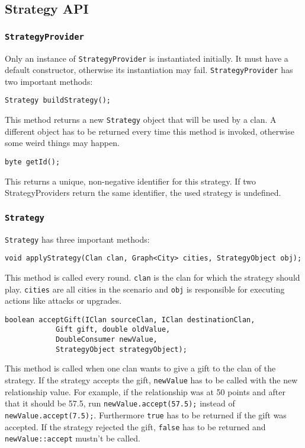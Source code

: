 \documentclass{article}
\begin{document}
    \subsection{Strategy API}

    \subsubsection{\texttt{StrategyProvider}}
    Only an instance of \texttt{StrategyProvider} is instantiated initially.
    It must have a default constructor, otherwise its instantiation may fail. \texttt{StrategyProvider} has two important methods:
    \begin{verbatim}
Strategy buildStrategy();
    \end{verbatim}
    This method returns a new \texttt{Strategy} object that will be used by a clan.
    A different object has to be returned every time this method is invoked, otherwise some weird things may happen.
    \begin{verbatim}
byte getId();
    \end{verbatim}
    This returns a unique, non-negative identifier for this strategy.
    If two StrategyProviders return the same identifier, the used strategy is undefined.

    \subsubsection{\texttt{Strategy}}
    \texttt{Strategy} has three important methods:
    \begin{verbatim}
void applyStrategy(Clan clan, Graph<City> cities, StrategyObject obj);
    \end{verbatim}
    This method is called every round. \texttt{clan} is the clan for which the strategy should play. \texttt{cities} are all cities in the scenario and  \texttt{obj} is responsible for executing
    actions like attacks or upgrades.
    \begin{verbatim}
boolean acceptGift(IClan sourceClan, IClan destinationClan,
			Gift gift, double oldValue,
			DoubleConsumer newValue,
			StrategyObject strategyObject);
    \end{verbatim}
    This method is called when one clan wants to give a gift to the clan of the strategy.
    If the strategy accepts the gift, \texttt{newValue} has to be called with the new relationship value.
    For example, if the relationship
    was at 50 points and after that it should be 57.5, run \texttt{newValue.accept(57.5);} instead of \texttt{newValue.accept(7.5);}.
    Furthermore \texttt{true} has to be returned if the gift was accepted.
    If the strategy rejected the gift, \texttt{false} has to be returned and \texttt{newValue::accept} mustn't be called.
\end{document}
